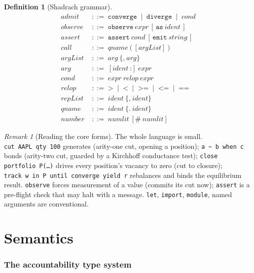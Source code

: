 \documentclass[11pt,a4paper]{article}
\theoremstyle{thmstyle}
\theoremstyle{definition}
\newtheorem{definition}[theorem]{Definition}
\theoremstyle{remark}
\newtheorem{remark}[theorem]{Remark}
\newcommand{\bnf}{\;::=\;}
\newcommand{\alt}{\;\mid\;}
\newcommand{\sh}[1]{\texttt{#1}}
\begin{document}
\begin{definition}[Shadrach grammar]
\begin{align*}
\textit{admit} &\bnf \sh{converge} \alt \sh{diverge} \alt \textit{cond} \\[2pt]
\textit{observe} &\bnf \sh{observe}\ \textit{expr}\
   [\,\sh{as}\ \textit{ident}\,] \\[2pt]
\textit{assert} &\bnf \sh{assert}\ \textit{cond}\
   [\,\sh{emit}\ \textit{string}\,] \\[2pt]
\textit{call} &\bnf \textit{qname}\ \sh{(}\ [\textit{argList}]\ \sh{)} \\
\textit{argList} &\bnf \textit{arg}\ \{\sh{,}\ \textit{arg}\} \\
\textit{arg} &\bnf [\textit{ident}\ \sh{:}]\ \textit{expr} \\[2pt]
\textit{cond} &\bnf \textit{expr}\ \textit{relop}\ \textit{expr} \\
\textit{relop} &\bnf \sh{>} \alt \sh{<} \alt \sh{>=} \alt \sh{<=}
   \alt \sh{==} \\[2pt]
\textit{repList} &\bnf \textit{ident}\ \{\sh{,}\ \textit{ident}\} \\
\textit{qname} &\bnf \textit{ident}\ \{\sh{.}\ \textit{ident}\} \\
\textit{number} &\bnf \textit{numlit}\ [\sh{\#}\ \textit{numlit}]
\end{align*}
\end{definition}

\begin{remark}[Reading the core forms]
\label{rem:core-forms}
The whole language is small. \sh{cut\ AAPL\ qty\ 100} generates
(arity-one cut, opening a position); \sh{a\ \~{}\ b\ when\ c} bonds
(arity-two cut, guarded by a Kirchhoff conductance test); \sh{close
portfolio\ P(\ldots)} drives every position's vacancy to zero (cut to
closure); \sh{track\ w\ in\ P\ until\ converge\ yield\ r} rebalances
and binds the equilibrium result. \sh{observe} forces measurement of a
value (commits its cut now); \sh{assert} is a pre-flight check that
may halt with a message. \sh{let}, \sh{import}, \sh{module}, named
arguments are conventional.
\end{remark}

\part{Semantics}

\section{The accountability type system}
\label{sec:types}
\end{document}
